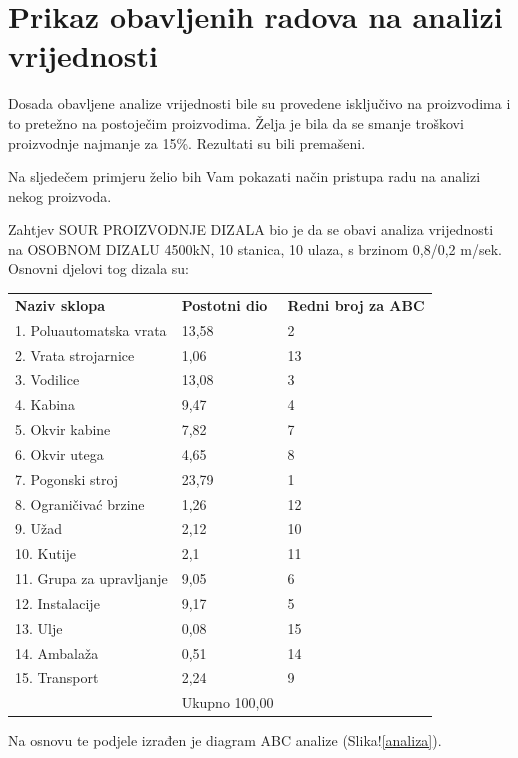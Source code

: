 \documentclass[a4paper,12pt]{article}
\numberwithin{figure}{section}
\begin{document}
\section*{Prikaz obavljenih radova na analizi vrijednosti}
Dosada obavljene analize vrijednosti bile su provedene isključivo na proizvodima i to pretežno na postoječim proizvodima. Želja je bila da se smanje troškovi proizvodnje najmanje za 15\%. Rezultati su bili premašeni.\par
Na sljedečem primjeru želio bih Vam pokazati način pristupa radu na analizi nekog proizvoda.\par
Zahtjev SOUR PROIZVODNJE DIZALA bio je da se obavi analiza vrijednosti na OSOBNOM DIZALU 4500kN, 10 stanica, 10 ulaza, s brzinom 0,8/0,2 m/sek. Osnovni djelovi tog dizala su:
\FloatBarrier
\begin{table}[h!]
\centering
\begin{tabular}{lll}
\textbf{Naziv sklopa}             & \textbf{Postotni dio}  & \textbf{Redni broj za ABC} \\
1. Poluautomatska vrata  & 13,58         & 2                 \\
2. Vrata strojarnice     & 1,06          & 13                \\
3. Vodilice              & 13,08         & 3                 \\
4. Kabina                & 9,47          & 4                 \\
5. Okvir kabine          & 7,82          & 7                 \\
6. Okvir utega           & 4,65          & 8                 \\
7. Pogonski stroj        & 23,79         & 1                 \\
8. Ograničivać brzine    & 1,26          & 12                \\
9. Užad                  & 2,12          & 10                \\
10. Kutije               & 2,1           & 11                \\
11. Grupa za upravljanje & 9,05          & 6                 \\
12. Instalacije          & 9,17          & 5                 \\
13. Ulje                 & 0,08          & 15                \\
14. Ambalaža             & 0,51          & 14                \\
15. Transport            & 2,24          & 9                 \\ \hline
                         & Ukupno 100,00 &                  
\end{tabular}
\end{table}
Na osnovu te podjele izrađen je diagram ABC analize (Slika!\ref{analiza}).
\end{document}
